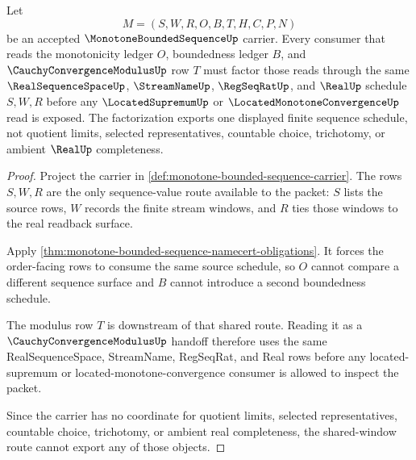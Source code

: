 \begin{theorem}
\label{thm:monotone-bounded-sequence-scheduled-window-factorization}
Let
$$
M=(S,W,R,O,B,T,H,C,P,N)
$$
be an accepted $\MonotoneBoundedSequenceUp$ carrier. Every consumer that reads the monotonicity ledger $O$, boundedness ledger $B$, and $\CauchyConvergenceModulusUp$ row $T$ must factor those reads through the same $\RealSequenceSpaceUp$, $\StreamNameUp$, $\RegSeqRatUp$, and $\RealUp$ schedule $S,W,R$ before any $\LocatedSupremumUp$ or $\LocatedMonotoneConvergenceUp$ read is exposed. The factorization exports one displayed finite sequence schedule, not quotient limits, selected representatives, countable choice, trichotomy, or ambient $\RealUp$ completeness.
\end{theorem}
\begin{proof}
Project the carrier in \autoref{def:monotone-bounded-sequence-carrier}. The rows $S,W,R$ are the only sequence-value route available to the packet: $S$ lists the source rows, $W$ records the finite stream windows, and $R$ ties those windows to the real readback surface.

Apply \autoref{thm:monotone-bounded-sequence-namecert-obligations}. It forces the order-facing rows to consume the same source schedule, so $O$ cannot compare a different sequence surface and $B$ cannot introduce a second boundedness schedule.

The modulus row $T$ is downstream of that shared route. Reading it as a $\CauchyConvergenceModulusUp$ handoff therefore uses the same RealSequenceSpace, StreamName, RegSeqRat, and Real rows before any located-supremum or located-monotone-convergence consumer is allowed to inspect the packet.

Since the carrier has no coordinate for quotient limits, selected representatives, countable choice, trichotomy, or ambient real completeness, the shared-window route cannot export any of those objects.
\end{proof}

